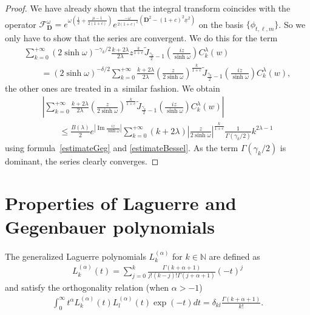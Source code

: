 \documentclass[11pt]{article}
\numberwithin{equation}{section}
\numberwithin{theorem}{section}
\numberwithin{proposition}{section}
\numberwithin{lemma}{section}
\numberwithin{corollary}{section}
\numberwithin{definition}{section}
\numberwithin{example}{section}
\numberwithin{remark}{section}
\numberwithin{note}{section}
\theoremstyle{remark}
\newcommand{\mN}{\mathbb{N}}
\newcommand{\cF}{\mathcal{F}}
\newcommand{\dD}{\textbf{D}}
\newcommand{\ux}{\underline{x}}
\def\l{{\lambda}}
\def\d{{\delta}}
\def\o{{\omega}}
\begin{document}
\begin{proof}
We have already shown that the integral transform coincides with the operator $\cF_{\dD}^{\o}=
e^{\o\left(\frac{1}{2}+\frac{\mu-1}{2(1+c)}\right)}e^{\frac{-\o}{2(1+c)^{2}}\left(\dD^{2}-
(1+c)^{2}\ux^{2}\right)}$ on the basis $\{\phi_{t,\ell,m}\}$.
So we only have to show that the series are convergent.
We do this for the term
\begin{gather*}
\sum_{k=0}^{+\infty} (2 \sinh{\o})^{-\gamma_{k}/2} \frac{k+2\l}{2\l} z^{\frac{k}{1+c}}
\widetilde{J}_{\frac{\gamma_{k}}{2}-1}\left(\frac{iz}{\sinh{\o}}\right) C_{k}^{\l}(w)\\
\qquad
{}= (2 \sinh{\o})^{-\d/2} \sum_{k=0}^{+\infty} \frac{k+2\l}{2\l} \left(\frac{z}{2
\sinh{\o}}\right)^{\frac{k}{1+c}}
\widetilde{J}_{\frac{\gamma_{k}}{2}-1}\left(\frac{iz}{\sinh{\o}}\right) C_{k}^{\l}(w),
\end{gather*}
the other ones are treated in a~similar fashion.
We obtain
\begin{gather*}
\left| \sum_{k=0}^{+\infty} \frac{k+2\l}{2\l} \left(\frac{z}{2 \sinh{\o}}\right)^{\frac{k}{1+c}}
\widetilde{J}_{\frac{\gamma_{k}}{2}-1}\left(\frac{iz}{\sinh{\o}}\right) C_{k}^{\l}(w) \right| \\
\qquad
{}\leq \frac{B(\l)}{2}e^{\left|\operatorname{Im}{\frac{iz}{\sinh{\o}}}\right|}\sum_{k=0}^{+\infty}(k+2\l)\left|\frac{z}{2
\sinh{\o}}\right|^{\frac{k}{1+c}} \frac{1}{\Gamma(\gamma_{k}/2)} k^{2\l-1}
\end{gather*}
using formula~\eqref{estimateGeg} and \eqref{estimateBessel}.
As the term $\Gamma(\gamma_{k}/2)$ is dominant, the series clearly converges.
\end{proof}
\setcounter{section}{8}
\setcounter{subsection}{0}
\setcounter{subsubsection}{0}
\setcounter{equation}{1}
\appendix

\section{Properties of Laguerre and Gegenbauer polynomials}\label{appendixA}

The generalized Laguerre polynomials $L_k^{(\alpha)}$ for $k\in\mN$ are def\/ined as
\begin{gather*}%
L_k^{(\alpha)}(t)=\sum_{j=0}^{k}\frac{\Gamma(k+\alpha+1)}{j!(k-j)!\Gamma(j+\alpha+1)}(-t)^j
\end{gather*}
and satisfy the orthogonality relation (when $\alpha>-1$)
\begin{gather*}
\int_{0}^\infty t^{\alpha}
L^{(\alpha)}_k(t)L^{(\alpha)}_l(t)\exp(-t)dt=\delta_{kl}\frac{\Gamma(k+\alpha+1)}{k!}.
\end{gather*}
\end{document}
